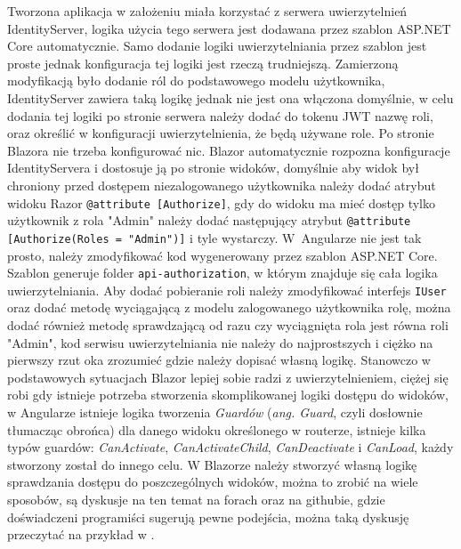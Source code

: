 \documentclass[12pt,a4paper,oneside]{book}
\begin{document}
Tworzona aplikacja w założeniu miała korzystać z serwera uwierzytelnień IdentityServer, logika użycia tego serwera jest dodawana przez szablon ASP.NET Core automatycznie. Samo dodanie logiki uwierzytelniania przez szablon jest proste jednak konfiguracja tej logiki jest rzeczą trudniejszą. Zamierzoną modyfikacją było dodanie ról do podstawowego modelu użytkownika, IdentityServer zawiera taką logikę jednak nie jest ona włączona domyślnie, w celu dodania tej logiki po stronie serwera należy dodać do tokenu JWT nazwę roli, oraz określić w konfiguracji uwierzytelnienia, że będą używane role. Po stronie Blazora nie trzeba konfigurować nic. Blazor automatycznie rozpozna konfiguracje IdentityServera i dostosuje ją po stronie widoków, domyślnie aby widok był chroniony przed dostępem niezalogowanego użytkownika należy dodać atrybut widoku Razor \texttt{@attribute [Authorize]}, gdy do widoku ma mieć dostęp tylko użytkownik z rola "Admin" należy dodać następujący atrybut \texttt{@attribute [Authorize(Roles = "Admin")]} i tyle wystarczy. W~Angularze nie jest tak prosto, należy zmodyfikować kod wygenerowany przez szablon ASP.NET Core. Szablon generuje folder \texttt{api-authorization}, w którym znajduje się cała logika uwierzytelniania. Aby dodać pobieranie roli należy zmodyfikować interfejs \texttt{IUser} oraz dodać metodę wyciągającą z modelu zalogowanego użytkownika rolę, można dodać również metodę sprawdzającą od razu czy wyciągnięta rola jest równa roli "Admin", kod serwisu uwierzytelniania nie należy do najprostszych i ciężko na pierwszy rzut oka zrozumieć gdzie należy dopisać własną logikę. Stanowczo w podstawowych sytuacjach Blazor lepiej sobie radzi z uwierzytelnieniem, ciężej się robi gdy istnieje potrzeba stworzenia skomplikowanej logiki dostępu do widoków, w Angularze istnieje logika tworzenia \textit{Guardów} (\textit{ang. Guard}, czyli dosłownie tłumacząc obrońca) dla danego widoku określonego w routerze, istnieje kilka typów guardów: \textit{CanActivate}, \textit{CanActivateChild}, \textit{CanDeactivate} i \textit{CanLoad}, każdy stworzony został do innego celu. W Blazorze należy stworzyć własną logikę sprawdzania dostępu do poszczególnych widoków, można to zrobić na wiele sposobów, są dyskusje na ten temat na forach oraz na githubie, gdzie doświadczeni programiści sugerują pewne podejścia, można taką dyskusję przeczytać na przykład w \cite{BLAZOR_ROUTE_GUARDS}.
\end{document}
